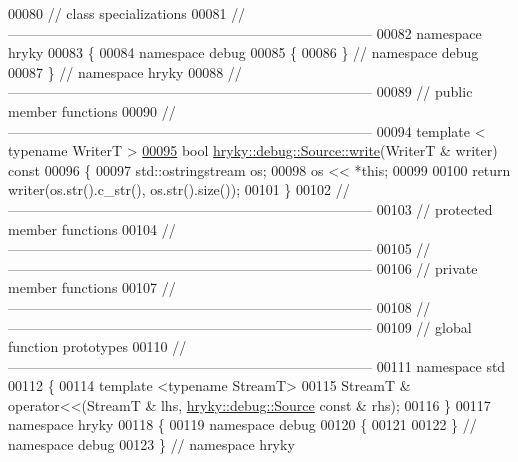 \begin{DoxyCode}
00080 \textcolor{comment}{// class specializations}
00081 \textcolor{comment}{//
      ------------------------------------------------------------------------------}
00082 \textcolor{keyword}{namespace }hryky
00083 \{
00084 \textcolor{keyword}{namespace }debug
00085 \{
00086 \} \textcolor{comment}{// namespace debug}
00087 \} \textcolor{comment}{// namespace hryky}
00088 \textcolor{comment}{//
      ------------------------------------------------------------------------------}
00089 \textcolor{comment}{// public member functions}
00090 \textcolor{comment}{//
      ------------------------------------------------------------------------------}
00094 \textcolor{comment}{}\textcolor{keyword}{template} < \textcolor{keyword}{typename} WriterT >
\hypertarget{debug__source_8h_source_l00095}{}\hyperlink{classhryky_1_1debug_1_1_source_ab62a09b6751c4aeda798a62e4a9a572b}{00095} \textcolor{keywordtype}{bool} \hyperlink{classhryky_1_1debug_1_1_source_ab62a09b6751c4aeda798a62e4a9a572b}{hryky::debug::Source::write}(WriterT & writer)\textcolor{keyword}{ const}
00096 \textcolor{keyword}{}\{
00097     std::ostringstream os;
00098     os << *\textcolor{keyword}{this};
00099 
00100     \textcolor{keywordflow}{return} writer(os.str().c\_str(), os.str().size());
00101 \}
00102 \textcolor{comment}{//
      ------------------------------------------------------------------------------}
00103 \textcolor{comment}{// protected member functions}
00104 \textcolor{comment}{//
      ------------------------------------------------------------------------------}
00105 \textcolor{comment}{//
      ------------------------------------------------------------------------------}
00106 \textcolor{comment}{// private member functions}
00107 \textcolor{comment}{//
      ------------------------------------------------------------------------------}
00108 \textcolor{comment}{//
      ------------------------------------------------------------------------------}
00109 \textcolor{comment}{// global function prototypes}
00110 \textcolor{comment}{//
      ------------------------------------------------------------------------------}
00111 \textcolor{keyword}{namespace }std
00112 \{
00114     \textcolor{keyword}{template} <\textcolor{keyword}{typename} StreamT>
00115     StreamT & operator<<(StreamT & lhs, \hyperlink{classhryky_1_1debug_1_1_source}{hryky::debug::Source} \textcolor{keyword}{const} & rhs);
00116 \}
00117 \textcolor{keyword}{namespace }hryky
00118 \{
00119 \textcolor{keyword}{namespace }debug
00120 \{
00121 
00122 \} \textcolor{comment}{// namespace debug}
00123 \} \textcolor{comment}{// namespace hryky}

\end{DoxyCode}
